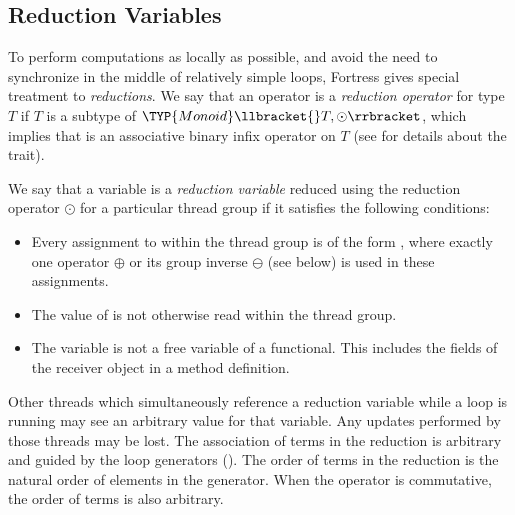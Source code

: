 %
%
%
%

\subsection{Reduction Variables}


To perform computations as locally as possible, and avoid the need to
synchronize in the middle of relatively simple  loops,
Fortress gives special treatment to \emph{reductions}.  We say that an
operator \EXP{\odot} is a \emph{reduction operator} for type $T$ if
$T$ is a subtype of
\(\TYP{Monoid}\llbracket{}T, \odot\rrbracket\), which implies that
\EXP{\odot} is an associative binary infix operator on $T$ (see
 for details about the
 trait).

We say that a variable  is a \emph{reduction variable} reduced using
the reduction operator $\odot$ for a particular thread group if it
satisfies the following conditions:
\begin{itemize}
\item Every assignment to  within the thread group is of the
  form , where exactly one operator $\oplus$ or its
  group inverse $\ominus$ (see below) is used in these assignments.
\item The value of  is not otherwise read within the thread group.
\item The variable  is not a free variable of a functional.
  This includes the fields of the receiver object in a method
  definition.
\end{itemize}
Other threads which simultaneously reference a reduction variable
while a loop is running may see an arbitrary value for that variable.
Any updates performed by those threads may be lost.  The association
of terms in the reduction is arbitrary and guided by the loop
generators ().  The order of terms in the
reduction is the natural order of elements in the generator.  When the
operator is commutative, the order of terms is also arbitrary.

